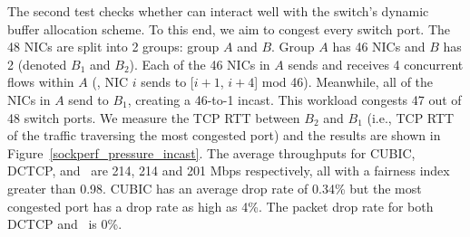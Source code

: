 The second test checks whether \acdc{} can interact well with the switch's dynamic 
buffer allocation scheme. To this end, we aim to congest every switch port.
The 48 NICs are split into 2 groups: group $A$ and $B$. 
Group $A$ has 46 NICs and $B$ has 2 (denoted $B_1$ and $B_2$). 
Each of the 46 NICs in $A$ sends and receives 4 concurrent flows within $A$ 
(\ie{}, NIC $i$ sends to [$i+1$, $i+4$] mod 46). 
Meanwhile, all of the NICs in $A$ send to $B_1$, creating a 46-to-1 incast. 
This workload congests 47 out of 48 switch ports. 
We measure the TCP RTT between $B_2$ and $B_1$ (i.e., TCP RTT of the traffic traversing the most congested port) and 
the results are shown in Figure~\ref{sockperf_pressure_incast}. 
The average throughputs for CUBIC, DCTCP, and~\acdc{} are 214, 214 and 201 Mbps respectively, 
all with a fairness index greater than 0.98. 
CUBIC has an average drop rate of 0.34\% but the most congested port has a drop rate as high as 4\%. 
The packet drop rate for both DCTCP and~\acdc{} is 0\%.



